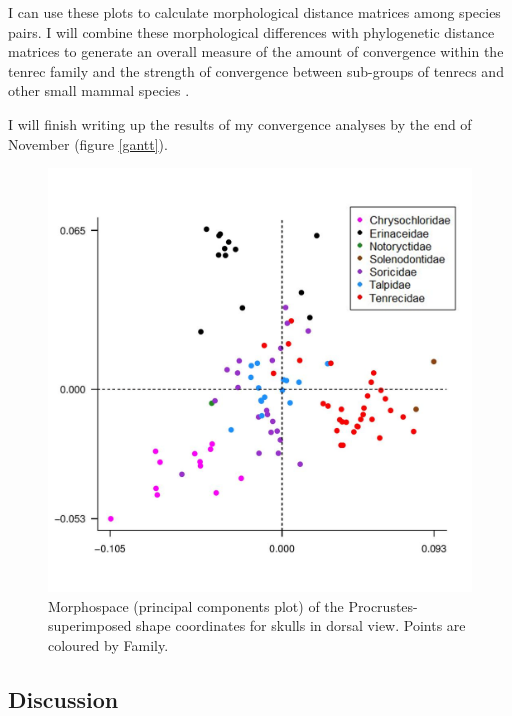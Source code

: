 \documentclass[12pt,a4paper]{article}
\begin{document}
	I can use these plots to calculate morphological distance matrices among species pairs. I will combine these morphological differences with phylogenetic distance matrices to generate an overall measure of the amount of convergence within the tenrec family \citep{Stayton2008} and the strength of convergence between sub-groups of tenrecs and other small mammal species \citep{Arbuckle2014}.

	I will finish writing up the results of my convergence analyses by the end of November (figure \ref{gantt}).

	

  \begin{figure}[!htb]
	\centering
	\includegraphics[width=\textwidth, height=\textheight, keepaspectratio=true]{skdors_allfam_PCA_legend.png}
		\caption{Morphospace (principal components plot) of the 		Procrustes-superimposed shape coordinates for skulls in dorsal view. Points are coloured by Family.}
	\label{fig:skdors_pca}
  \end{figure}

	

\subsection{Discussion}
\end{document}
